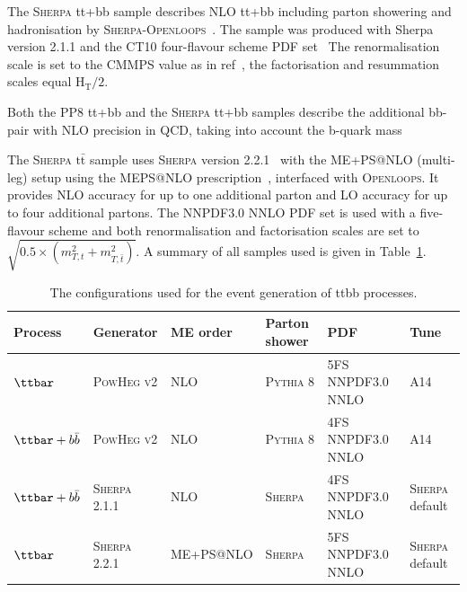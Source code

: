 The \textsc{Sherpa} tt+bb sample describes NLO tt+bb including parton showering and hadronisation by \textsc{Sherpa}-\textsc{Openloops}~\cite{Cascioli:2013era,Gleisberg:2008ta,Cascioli:2011va}. The sample was produced with Sherpa version 2.1.1 and the CT10 four-flavour scheme PDF set~\cite{Guzzi:2011sv,Gao:2013xoa} The renormalisation scale is set to the CMMPS value as in ref~\cite{Cascioli:2013era}, the factorisation and resummation scales equal $\mathrm{H_T/2}$.

Both the PP8 tt+bb and the \textsc{Sherpa} tt+bb samples describe the additional bb-pair with NLO precision in QCD, taking into account the b-quark mass

The \textsc{Sherpa} $\mathrm{t\bar{t}}$ sample uses \textsc{Sherpa} version 2.2.1~\cite{Gleisberg:2008ta} with the ME+PS@NLO (multi-leg) setup using the MEPS@NLO prescription~\cite{Hoeche:2012yf}, interfaced with \textsc{Openloops}. It provides NLO accuracy for up to one additional parton and LO accuracy for up to four additional partons. The NNPDF3.0 NNLO PDF set is used with a five-flavour scheme and both renormalisation and factorisation scales are set to $\sqrt{0.5\times(m_{T,t}^2+m_{T,\bar{t}}^2)}$. 
A summary of all samples used is given in Table~\ref{tab:ttbbsamples}.

\begin{table}
\begin{center}
\caption{\label{tab:ttbbsamples}
The configurations used for the event generation of ttbb processes.}
\vspace{0.25cm}
{\small
\setlength\tabcolsep{1.5pt}
\begin{tabular}{llllll}
\hline\hline
Process & Generator & ME order & Parton shower & PDF & Tune  \\
\hline
$\ttbar$  & \textsc{PowHeg v2} & \textsc{NLO} & \textsc{Pythia 8} &  5FS NNPDF3.0 NNLO & \textsc{A14}  \\
$\ttbar+b\bar{b}$  & \textsc{PowHeg v2} & \textsc{NLO} & \textsc{Pythia 8} &  4FS NNPDF3.0 NNLO & \textsc{A14}  \\
$\ttbar+b\bar{b}$  & \textsc{Sherpa 2.1.1} & \textsc{NLO} & \textsc{Sherpa} &  4FS NNPDF3.0 NNLO & \textsc{Sherpa} default  \\
$\ttbar$  & \textsc{Sherpa 2.2.1} & \textsc{ME+PS@NLO} & \textsc{Sherpa} &  5FS NNPDF3.0 NNLO & \textsc{Sherpa} default  \\
\hline\hline
\end{tabular}
}
\end{center}
\end{table}


